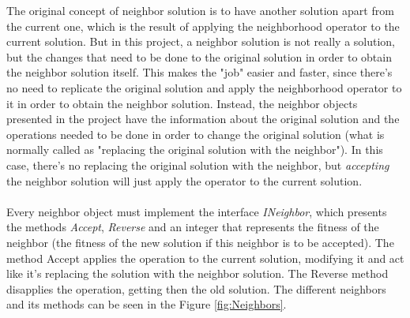 The original concept of neighbor solution is to have another solution apart from the current one, which is the result of applying the neighborhood operator to the current solution. But in this project, a neighbor solution is not really a solution, but the changes that need to be done to the original solution in order to obtain the neighbor solution itself. This makes the "job" easier and faster, since there's no need to replicate the original solution and apply the neighborhood operator to it in order to obtain the neighbor solution. Instead, the neighbor objects presented in the project have the information about the original solution and the operations needed to be done in order to change the original solution (what is normally called as "replacing the original solution with the neighbor"). In this case, there's no replacing the original solution with the neighbor, but \textit{accepting} the neighbor solution will just apply the operator to the current solution.\\
\\
Every neighbor object must implement the interface \textit{INeighbor}, which presents the methods \textit{Accept}, \textit{Reverse} and an integer that represents the fitness of the neighbor (the fitness of the new solution if this neighbor is to be accepted). The method Accept applies the operation to the current solution, modifying it and act like it's replacing the solution with the neighbor solution. The Reverse method disapplies the operation, getting then the old solution. The different neighbors and its methods can be seen in the Figure \ref{fig:Neighbors}.\\
